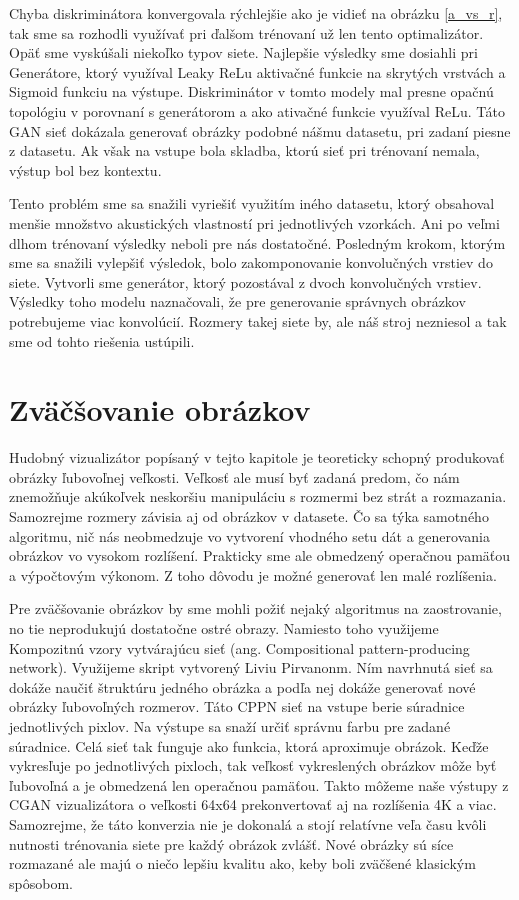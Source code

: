 Chyba diskriminátora konvergovala rýchlejšie ako je vidieť na obrázku \ref{a_vs_r}, tak sme sa rozhodli využívať pri ďalšom trénovaní už len tento optimalizátor.
Opäť sme vyskúšali niekoľko typov siete.
Najlepšie výsledky sme dosiahli pri Generátore, ktorý využíval Leaky ReLu aktivačné funkcie na skrytých vrstvách a Sigmoid funkciu na výstupe.
Diskriminátor v tomto modely mal presne opačnú topológiu v porovnaní s generátorom a ako ativačné funkcie využíval ReLu.
Táto GAN sieť dokázala generovať obrázky podobné nášmu datasetu, pri zadaní piesne z datasetu.
Ak však na vstupe bola skladba, ktorú sieť pri trénovaní nemala, výstup bol bez kontextu.

Tento problém sme sa snažili vyriešiť využitím iného datasetu, ktorý obsahoval menšie množstvo akustických vlastností pri jednotlivých vzorkách.
Ani po veľmi dlhom trénovaní výsledky neboli pre nás dostatočné.
Posledným krokom, ktorým sme sa snažili vylepšiť výsledok, bolo zakomponovanie konvolučných vrstiev do siete.
Vytvorli sme generátor, ktorý pozostával z dvoch konvolučných vrstiev.
Výsledky toho modelu naznačovali, že pre generovanie správnych obrázkov potrebujeme viac konvolúcií.
Rozmery takej siete by, ale náš stroj nezniesol a tak sme od tohto riešenia ustúpili.

\section{Zväčšovanie obrázkov}
Hudobný vizualizátor popísaný v tejto kapitole je teoreticky schopný produkovať obrázky ľubovoľnej veľkosti.
Veľkosť ale musí byť zadaná predom, čo nám znemožňuje akúkoľvek neskoršiu manipuláciu s rozmermi bez strát a rozmazania.
Samozrejme rozmery závisia aj od obrázkov v datasete.
Čo sa týka samotného algoritmu, nič nás neobmedzuje vo vytvorení vhodného setu dát a generovania obrázkov vo vysokom rozlíšení.
Prakticky sme ale obmedzený operačnou pamäťou a výpočtovým výkonom.
Z toho dôvodu je možné generovať len malé rozlíšenia.

Pre zväčšovanie obrázkov by sme mohli požiť nejaký algoritmus na zaostrovanie, no tie neprodukujú dostatočne ostré obrazy.
Namiesto toho využijeme Kompozitnú vzory vytvárajúcu sieť (ang. Compositional pattern-producing network).
Využijeme skript vytvorený Liviu Pirvanonm.
Ním navrhnutá sieť sa dokáže naučiť štruktúru jedného obrázka a podľa nej dokáže generovať nové obrázky ľubovoľných rozmerov.
Táto CPPN sieť na vstupe berie súradnice jednotlivých pixlov.
Na výstupe sa snaží určiť správnu farbu pre zadané súradnice.
Celá sieť tak funguje ako funkcia, ktorá aproximuje obrázok.
Keďže vykresľuje po jednotlivých pixloch, tak veľkosť vykreslených obrázkov môže byť ľubovoľná a je obmedzená len operačnou pamäťou.
Takto môžeme naše výstupy z CGAN vizualizátora o veľkosti 64x64 prekonvertovať aj na rozlíšenia 4K a viac.
Samozrejme, že táto konverzia nie je dokonalá a stojí relatívne veľa času kvôli nutnosti trénovania siete pre každý obrázok zvlášť.
Nové obrázky sú síce rozmazané ale majú o niečo lepšiu kvalitu ako, keby boli zväčšené klasickým spôsobom.

